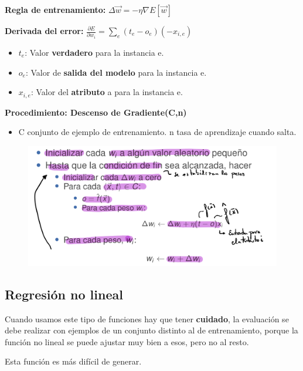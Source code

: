 \documentclass[12pt]{report} %
\begin{document}
\textbf{Regla de entrenamiento:}
\(\Delta \vec{w}=-\eta \nabla E[\vec{w}]\)

\textbf{Derivada del error:}
\(\frac{\partial E}{\partial w_{i}}=\sum_{e}\left(t_{e}-o_{e}\right)\left(-x_{i, e}\right)\)

\begin{itemize}

\item
  \(t_e\): Valor \textbf{verdadero} para la instancia e.
\item
  \(o_e\): Valor de \textbf{salida del modelo} para la instancia e.
\item
  \(x_{i,e}\): Valor del \textbf{atributo} a para la instancia e.
\end{itemize}
\newpage
\textbf{Procedimiento: Descenso de Gradiente(C,n)}

\begin{itemize}

\item
  C conjunto de ejemplo de entrenamiento. n tasa de aprendizaje cuando
  salta.
\end{itemize}

\begin{figure}[H]
	{\includegraphics[scale=.2]{image-20210305224415026.png}}
\end{figure}

\subsection{Regresión no lineal}

Cuando usamos este tipo de funciones hay que tener \textbf{cuidado}, la
evaluación se debe realizar con ejemplos de un conjunto distinto al de
entrenamiento, porque la función no lineal se puede ajustar muy bien a
esos, pero no al resto.

Esta función es más difícil de generar.
\end{document}

